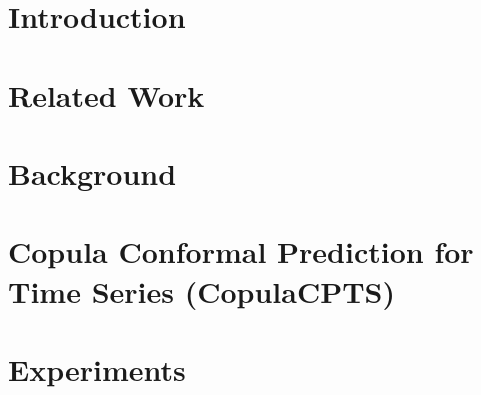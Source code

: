 

\section{Introduction}


\section{Related Work}



\section{Background}



\section{Copula Conformal Prediction for Time Series (CopulaCPTS)}



\section{Experiments}


